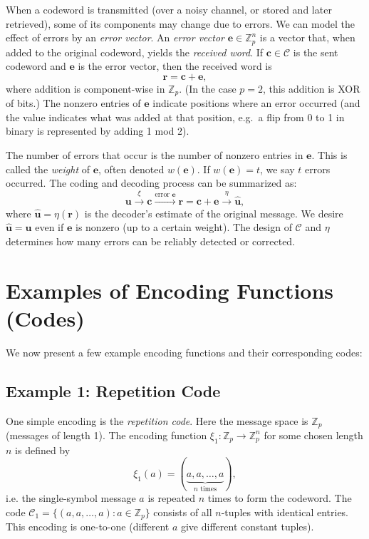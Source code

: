 \documentclass[docmute]{article}
\begin{document}
When a codeword is transmitted (over a noisy channel, or stored and later retrieved), some of its components may change due to errors. We can model the effect of errors by an \emph{error vector}. An \emph{error vector} \(\mathbf{e} \in \mathbb{Z}_p^n\) is a vector that, when added to the original codeword, yields the \emph{received word}. If \(\mathbf{c} \in \mathcal{C}\) is the sent codeword and \(\mathbf{e}\) is the error vector, then the received word is
\[
  \mathbf{r} = \mathbf{c} + \mathbf{e},
\]
where addition is component-wise in \(\mathbb{Z}_p\). (In the case \(p=2\), this addition is XOR of bits.) The nonzero entries of \(\mathbf{e}\) indicate positions where an error occurred (and the value indicates what was added at that position, e.g.\ a flip from 0 to 1 in binary is represented by adding 1 mod 2).

The number of errors that occur is the number of nonzero entries in \(\mathbf{e}\). This is called the \emph{weight} of \(\mathbf{e}\), often denoted \(w(\mathbf{e})\). If \(w(\mathbf{e}) = t\), we say \(t\) errors occurred. The coding and decoding process can be summarized as:
\[
  \mathbf{u} \xrightarrow{\xi} \mathbf{c}
            \xrightarrow{\text{error }\mathbf{e}}
            \mathbf{r} = \mathbf{c} + \mathbf{e}
            \xrightarrow{\eta} \hat{\mathbf{u}},
\]
where \(\hat{\mathbf{u}} = \eta(\mathbf{r})\) is the decoder’s estimate of the original message. We desire \(\hat{\mathbf{u}} = \mathbf{u}\) even if \(\mathbf{e}\) is nonzero (up to a certain weight). The design of \(\mathcal{C}\) and \(\eta\) determines how many errors can be reliably detected or corrected.


\section{Examples of Encoding Functions (Codes)}

We now present a few example encoding functions and their corresponding codes:

\subsection*{Example 1: Repetition Code}
One simple encoding is the \emph{repetition code}. Here the message space is $\mathbb{Z}_p$ (messages of length 1). The encoding function $\xi_1: \mathbb{Z}_p \to \mathbb{Z}_p^n$ for some chosen length $n$ is defined by 
\[ \xi_1(a) = (\underbrace{a, a, \ldots, a}_{n \text{ times}}), \] 
i.e. the single-symbol message $a$ is repeated $n$ times to form the codeword. The code $\mathcal{C}_1 = \{(a,a,\ldots,a) : a \in \mathbb{Z}_p\}$ consists of all $n$-tuples with identical entries. This encoding is one-to-one (different $a$ give different constant tuples).
\end{document}

